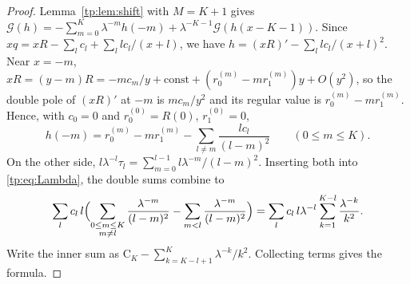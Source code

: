 \documentclass[11pt]{amsart}
\theoremstyle{definition}
\theoremstyle{remark}
\numberwithin{equation}{section}
\begin{document}
\begin{proof}
Lemma~\ref{tp:lem:shift} with $M=K+1$ gives
$\mathcal G(h)=-\sum_{m=0}^K\lambda^{-m}h(-m)+\lambda^{-K-1}\mathcal G(h(x-K-1))$. Since
$xq=xR-\sum_lc_l+\sum_l lc_l/(x+l)$, we have $h=(xR)'-\sum_llc_l/(x+l)^2$. Near $x=-m$,
$xR=(y-m)R=-mc_m/y+\text{const}+(r_0^{(m)}-mr_1^{(m)})y+O(y^2)$, so the double pole of $(xR)'$ at $-m$ is
$mc_m/y^2$ and its regular value is $r_0^{(m)}-mr_1^{(m)}$. Hence, with $c_0=0$ and
$r_0^{(0)}=R(0)$, $r_1^{(0)}=0$,
\[
 h(-m)=r_0^{(m)}-mr_1^{(m)}-\sum_{l\ne m}\frac{lc_l}{(l-m)^2}\qquad(0\le m\le K).
\]
On the other side, $l\lambda^{-l}\tau_l=\sum_{m=0}^{l-1}l\lambda^{-m}/(l-m)^2$. Inserting both into
\eqref{tp:eq:Lambda}, the double sums combine to
\[
 \sum_lc_l\,l\Bigl(\sum_{\substack{0\le m\le K\\ m\ne l}}\frac{\lambda^{-m}}{(l-m)^2}-\sum_{m<l}\frac{\lambda^{-m}}{(l-m)^2}\Bigr)
 =\sum_lc_l\,l\lambda^{-l}\sum_{k=1}^{K-l}\frac{\lambda^{-k}}{k^2}.
\]
Write the inner sum as $\mathrm C_K-\sum_{k=K-l+1}^K\lambda^{-k}/k^2$. Collecting terms gives the formula.
\end{proof}
\end{document}
